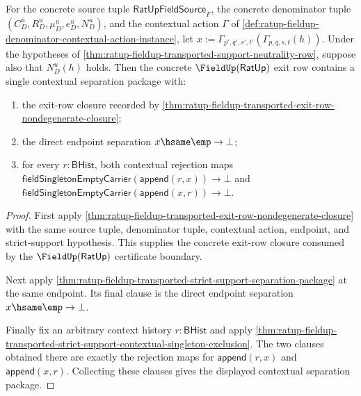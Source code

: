 \begin{theorem}
\label{thm:ratup-fieldup-transported-exit-row-contextual-separation-package}
For the concrete source tuple $\mathsf{RatUpFieldSource}_F$, the concrete
denominator tuple $(C_D^u,R_D^u,\mu_D^u,e_D^u,N_D^u)$, and the contextual
action $\Gamma$ of
\autoref{def:ratup-fieldup-denominator-contextual-action-instance}, let
$x:=\Gamma_{p',q',s',t'}(\Gamma_{p,q,s,t}(h))$. Under the hypotheses of
\autoref{thm:ratup-fieldup-transported-support-neutrality-row}, suppose also
that $N_D^u(h)$ holds. Then the concrete $\FieldUp(\mathsf{RatUp})$ exit row
contains a single contextual separation package with:
\begin{enumerate}
  \item the exit-row closure recorded by
  \autoref{thm:ratup-fieldup-transported-exit-row-nondegenerate-closure};
  \item the direct endpoint separation $x\hsame\emp\to\bot$;
  \item for every $r:\mathsf{BHist}$, both contextual rejection maps
  $\mathsf{fieldSingletonEmptyCarrier}(\mathsf{append}(r,x))\to\bot$ and
  $\mathsf{fieldSingletonEmptyCarrier}(\mathsf{append}(x,r))\to\bot$.
\end{enumerate}
\end{theorem}
\begin{proof}
First apply
\autoref{thm:ratup-fieldup-transported-exit-row-nondegenerate-closure} with the
same source tuple, denominator tuple, contextual action, endpoint, and
strict-support hypothesis. This supplies the concrete exit-row closure consumed
by the $\FieldUp(\mathsf{RatUp})$ certificate boundary.

Next apply
\autoref{thm:ratup-fieldup-transported-strict-support-separation-package} at the
same endpoint. Its final clause is the direct endpoint separation
$x\hsame\emp\to\bot$.

Finally fix an arbitrary context history $r:\mathsf{BHist}$ and apply
\autoref{thm:ratup-fieldup-transported-strict-support-contextual-singleton-exclusion}.
The two clauses obtained there are exactly the rejection maps for
$\mathsf{append}(r,x)$ and $\mathsf{append}(x,r)$. Collecting these clauses gives
the displayed contextual separation package.
\end{proof}

